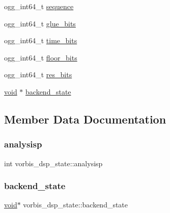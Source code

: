 \begin{DoxyCompactItemize}
\item 
ogg\+\_\+int64\+\_\+t \hyperlink{structvorbis__dsp__state_a38a8b96daf9d16d8cce0522e203635a6}{sequence}
\item 
ogg\+\_\+int64\+\_\+t \hyperlink{structvorbis__dsp__state_ae2d065c13e84870fd889c82cd2e7a04f}{glue\+\_\+bits}
\item 
ogg\+\_\+int64\+\_\+t \hyperlink{structvorbis__dsp__state_adef49c2187f4ed3381973274e1b01151}{time\+\_\+bits}
\item 
ogg\+\_\+int64\+\_\+t \hyperlink{structvorbis__dsp__state_a2913a4ebbbd6721c53264a2ca8466cea}{floor\+\_\+bits}
\item 
ogg\+\_\+int64\+\_\+t \hyperlink{structvorbis__dsp__state_a3091c7fac6b57c54027c32931a7e6ee0}{res\+\_\+bits}
\item 
\hyperlink{_s_d_l__opengles2__gl2ext_8h_ae5d8fa23ad07c48bb609509eae494c95}{void} $\ast$ \hyperlink{structvorbis__dsp__state_a97ff4df8d289e5e3968029e47d7f8162}{backend\+\_\+state}
\end{DoxyCompactItemize}


\subsection{Member Data Documentation}
\mbox{\label{structvorbis__dsp__state_a9b983a6901a311f2d354f2b6c51cf93b}} 
\subsubsection{\texorpdfstring{analysisp}{analysisp}}
{\footnotesize\ttfamily int vorbis\+\_\+dsp\+\_\+state\+::analysisp}

\mbox{\label{structvorbis__dsp__state_a97ff4df8d289e5e3968029e47d7f8162}} 
\subsubsection{\texorpdfstring{backend\+\_\+state}{backend\_state}}
{\footnotesize\ttfamily \hyperlink{_s_d_l__opengles2__gl2ext_8h_ae5d8fa23ad07c48bb609509eae494c95}{void}$\ast$ vorbis\+\_\+dsp\+\_\+state\+::backend\+\_\+state}

